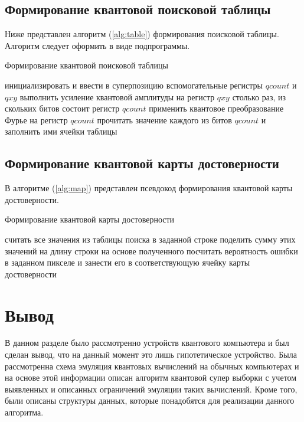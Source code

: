\subsection{Формирование квантовой поисковой таблицы}

Ниже представлен алгоритм (\ref{alg:table}) формирования поисковой таблицы. Алгоритм следует оформить в виде подпрограммы.

\begin{algorithm}
	\caption{Формирование квантовой поисковой таблицы}
	\label{alg:table}
	\begin{algorithmic}[1]
		\State инициализировать и ввести в суперпозицию вспомогательные регистры $qcount$ и $qxy$
		\State выполнить усиление квантовой амплитуды на регистр $qxy$ столько раз, из скольких битов состоит регистр $qcount$
		\State применить квантовое преобразование Фурье на регистр $qcount$
		\State прочитать значение каждого из битов $qcount$ и заполнить ими ячейки таблицы
	\end{algorithmic}
\end{algorithm}

\subsection{Формирование квантовой карты достоверности}

В алгоритме (\ref{alg:map}) представлен псевдокод формирования квантовой карты достоверности.

\begin{algorithm}
	\caption{Формирование квантовой карты достоверности}
	\label{alg:map}
	\begin{algorithmic}[1]
		\State считать все значения из таблицы поиска в заданной строке
		\State поделить сумму этих значений на длину строки
		\State на основе полученного посчитать вероятность ошибки в заданном пикселе и занести его в соответствующую ячейку карты достоверности
	\end{algorithmic}
\end{algorithm}


\section*{Вывод}

В данном разделе было рассмотренно устройств квантового компьютера и был сделан вывод, что на данный момент это лишь гипотетическое устройство. Была рассмотренна схема эмуляция квантовых вычислений на обычных компьютерах и на основе этой информации описан алгоритм квантовой супер выборки с учетом выявленных и описанных ограничений эмуляции таких вычислений. Кроме того, были описаны структуры данных, которые понадобятся для реализации данного алгоритма.
